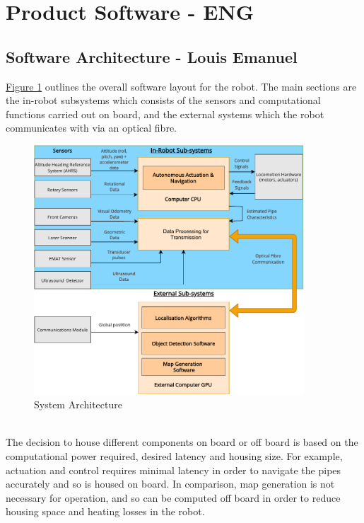 \documentclass[11pt]{article}		%
\newcommand{\figref}[1]{\hyperref[#1]{Figure \ref*{#1}}}    %
\begin{document}
	\section{Product Software - ENG}
		\subsection[Software Architecture] {Software Architecture - Louis Emanuel}
            \begin{floatingfigure}[r]{0pt} \end{floatingfigure}  
            \figref{overalls} outlines the overall software layout for the robot. The main sections are the in-robot subsystems which consists of the sensors and computational functions carried out on board, and the external systems which the robot communicates with via an optical fibre.
    		\begin{figure}[h]
				\centering
				\includegraphics[width = 0.9\textwidth]{subsystemss}
				\caption{System Architecture}
				\label{overalls}
			\end{figure}
			\\
	        \hspace*{2ex}The decision to house different components on board or off board is based on the computational power required, desired latency and housing size. For example, actuation and control requires minimal latency in order to navigate the pipes accurately and so is housed on board. In comparison, map generation is not necessary for operation, and so can be computed off board in order to reduce housing space and heating losses in the robot.
\end{document}
